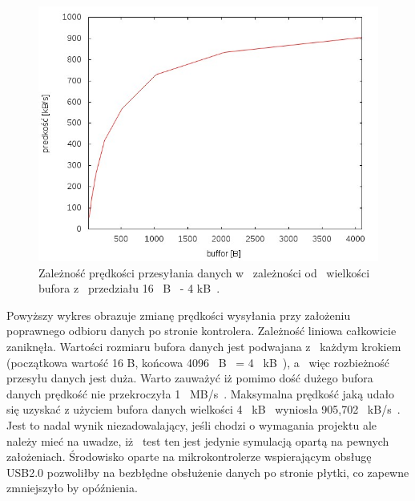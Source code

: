 \documentclass{BscUS}
\begin{document}
\begin{figure}[H]
{
\centering
\captionsetup{justification=centering}
\includegraphics[width=1\textwidth]{./img/S_bbuf1}
\caption{Zależność prędkości przesyłania danych w~ zależności od~ wielkości bufora z~ przedziału 16~ B~ - 4 kB~.}
\label{fig:S_bbuf1}
}
\end{figure}
\noindent Powyższy wykres obrazuje zmianę prędkości wysyłania przy założeniu poprawnego odbioru danych po stronie kontrolera. Zależność liniowa całkowicie zaniknęła. Wartości rozmiaru bufora danych jest podwajana z~ każdym krokiem (początkowa wartość 16 B, końcowa 4096~ B~ = 4~ kB~), a~ więc rozbieżność przesyłu danych jest duża. Warto zauważyć iż pomimo dość dużego bufora danych prędkość nie przekroczyła 1~ MB/s~. Maksymalna prędkość jaką udało się uzyskać z użyciem bufora danych wielkości 4~ kB~ wyniosła 905,702~ kB/s~. Jest to nadal wynik niezadowalający, jeśli chodzi o wymagania projektu ale należy mieć na uwadze, iż~ test ten jest jedynie symulacją opartą na pewnych założeniach. Środowisko oparte na mikrokontrolerze wspierającym obsługę USB2.0 pozwoliłby na bezbłędne obsłużenie danych po stronie płytki, co zapewne zmniejszyło by opóźnienia.
\end{document}
